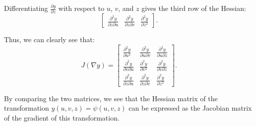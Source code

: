\begin{qsolve}
\begin{qsolve}[]
      Differentiating \( \frac{\partial y}{\partial z} \) with respect to \( u \), \( v \), and \( z \) gives the third row of the Hessian:
      \[
      \begin{bmatrix} \frac{\partial^2 y}{\partial z \partial u} & \frac{\partial^2 y}{\partial z \partial v} & \frac{\partial^2 y}{\partial z^2} \end{bmatrix}.
      \]
      
      Thus, we can clearly see that:
      \[
      J(\nabla y) = \begin{bmatrix}
      \frac{\partial^2 y}{\partial u^2} & \frac{\partial^2 y}{\partial u \partial v} & \frac{\partial^2 y}{\partial u \partial z} \\
      \frac{\partial^2 y}{\partial v \partial u} & \frac{\partial^2 y}{\partial v^2} & \frac{\partial^2 y}{\partial v \partial z} \\
      \frac{\partial^2 y}{\partial z \partial u} & \frac{\partial^2 y}{\partial z \partial v} & \frac{\partial^2 y}{\partial z^2}
      \end{bmatrix}.
      \]
      
      By comparing the two matrices, we see that the Hessian matrix of the transformation \( y(u, v, z) = \psi(u, v, z) \) can be expressed as the Jacobian matrix of the gradient of this transformation.
      \end{qsolve}
\end{qsolve}